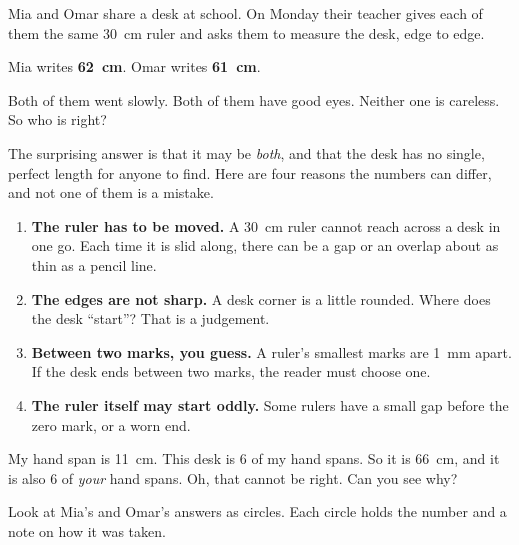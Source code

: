 \label{ch1}

Mia and Omar share a desk at school. On Monday their teacher gives each of them the same 30~cm ruler and asks them to measure the desk, edge to edge.

Mia writes \textbf{62~cm}. Omar writes \textbf{61~cm}.

Both of them went slowly. Both of them have good eyes. Neither one is careless. So who is right?

The surprising answer is that it may be \emph{both}, and that the desk has no single, perfect length for anyone to find. Here are four reasons the numbers can differ, and not one of them is a mistake.

\begin{enumerate}[leftmargin=1.8em,itemsep=0.35em]
\item \textbf{The ruler has to be moved.} A 30~cm ruler cannot reach across a desk in one go. Each time it is slid along, there can be a gap or an overlap about as thin as a pencil line.
\item \textbf{The edges are not sharp.} A desk corner is a little rounded. Where does the desk ``start''? That is a judgement.
\item \textbf{Between two marks, you guess.} A ruler's smallest marks are 1~mm apart. If the desk ends between two marks, the reader must choose one.
\item \textbf{The ruler itself may start oddly.} Some rulers have a small gap before the zero mark, or a worn end.
\end{enumerate}

\begin{multix}[hmm]\multixbot[hmm]\tcblower
My hand span is 11~cm. This desk is 6 of my hand spans. So it is 66~cm, and it is also 6 of \emph{your} hand spans. Oh, that cannot be right. Can you see why?
\end{multix}

Look at Mia's and Omar's answers as circles. Each circle holds the number and a note on how it was taken.

\begin{center}
\end{center}

